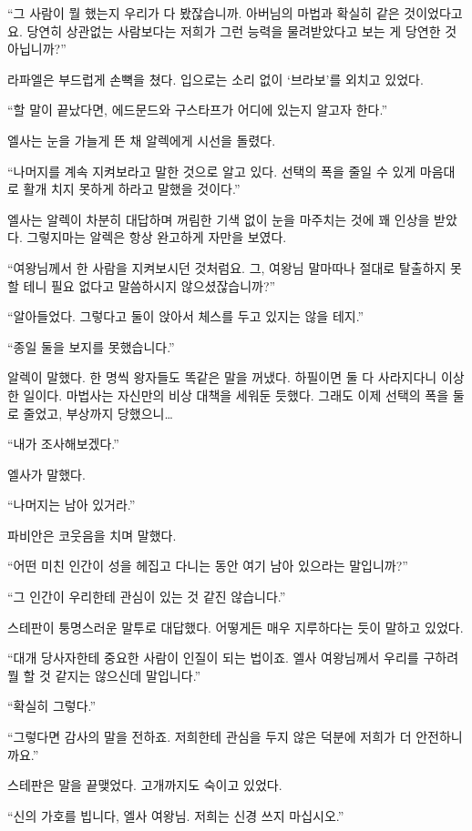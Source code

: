 ``그 사람이 뭘 했는지 우리가 다 봤잖습니까. 아버님의 마법과 확실히 같은 것이었다고요. 당연히 상관없는 사람보다는 저희가 그런 능력을 물려받았다고 보는 게 당연한 것 아닙니까?''

라파엘은 부드럽게 손뼉을 쳤다. 입으로는 소리 없이 `브라보'를 외치고 있었다.

``할 말이 끝났다면, 에드문드와 구스타프가 어디에 있는지 알고자 한다.''

엘사는 눈을 가늘게 뜬 채 알렉에게 시선을 돌렸다.

``나머지를 계속 지켜보라고 말한 것으로 알고 있다. 선택의 폭을 줄일 수 있게 마음대로 활개 치지 못하게 하라고 말했을 것이다.''

엘사는 알렉이 차분히 대답하며 꺼림한 기색 없이 눈을 마주치는 것에 꽤 인상을 받았다. 그렇지마는 알렉은 항상 완고하게 자만을 보였다.

``여왕님께서 한 사람을 지켜보시던 것처럼요. 그, 여왕님 말마따나 절대로 탈출하지 못할 테니 필요 없다고 말씀하시지 않으셨잖습니까?''

``알아들었다. 그렇다고 둘이 앉아서 체스를 두고 있지는 않을 테지.''

``종일 둘을 보지를 못했습니다.''

알렉이 말했다. 한 명씩 왕자들도 똑같은 말을 꺼냈다. 하필이면 둘 다 사라지다니 이상한 일이다. 마법사는 자신만의 비상 대책을 세워둔 듯했다. 그래도 이제 선택의 폭을 둘로 줄었고, 부상까지 당했으니\ldots

``내가 조사해보겠다.''

엘사가 말했다.

``나머지는 남아 있거라.''

파비안은 코웃음을 치며 말했다.

``어떤 미친 인간이 성을 헤집고 다니는 동안 여기 남아 있으라는 말입니까?''

``그 인간이 우리한테 관심이 있는 것 같진 않습니다.''

스테판이 퉁명스러운 말투로 대답했다. 어떻게든 매우 지루하다는 듯이 말하고 있었다.

``대개 당사자한테 중요한 사람이 인질이 되는 법이죠. 엘사 여왕님께서 우리를 구하려 뭘 할 것 같지는 않으신데 말입니다.''

``확실히 그렇다.''

``그렇다면 감사의 말을 전하죠. 저희한테 관심을 두지 않은 덕분에 저희가 더 안전하니까요.''

스테판은 말을 끝맺었다. 고개까지도 숙이고 있었다.

``신의 가호를 빕니다, 엘사 여왕님. 저희는 신경 쓰지 마십시오.''

